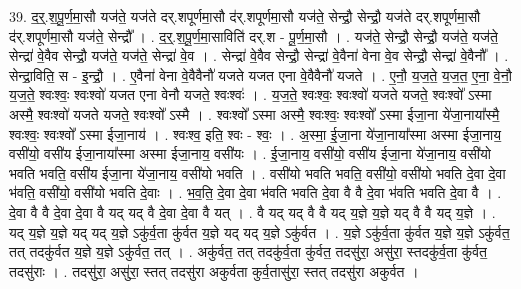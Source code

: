 \documentclass[17pt]{extarticle}
\begin{document}
39. द॒र्॒.श॒पू॒र्ण॒मा॒सौ यज॑ते॒ यज॑ते दर्.शपूर्णमा॒सौ द॑र्.शपूर्णमा॒सौ यज॑ते॒ सेन्द्रौ॒ सेन्द्रौ॒ यज॑ते दर्.शपूर्णमा॒सौ द॑र्.शपूर्णमा॒सौ यज॑ते॒ सेन्द्रौ᳚ । . द॒र्॒.श॒पू॒र्ण॒मा॒साविति॑ दर्.श - पू॒र्ण॒मा॒सौ । . यज॑ते॒ सेन्द्रौ॒ सेन्द्रौ॒ यज॑ते॒ यज॑ते॒ सेन्द्रा॑ वे॒वैव सेन्द्रौ॒ यज॑ते॒ यज॑ते॒ सेन्द्रा॑ वे॒व । . सेन्द्रा॑ वे॒वैव सेन्द्रौ॒ सेन्द्रा॑ वे॒वैना॑ वेना वे॒व सेन्द्रौ॒ सेन्द्रा॑ वे॒वैनौ᳚ । . सेन्द्रा॒विति॒ स - इ॒न्द्रौ॒ । . ए॒वैना॑ वेना वे॒वैवैनौ॑ यजते यजत एना वे॒वैवैनौ॑ यजते । . ए॒नौ॒ य॒ज॒ते॒ य॒ज॒त॒ ए॒ना॒ वे॒नौ॒ य॒ज॒ते॒ श्वःश्वः॒ श्वःश्वो॑ यजत एना वेनौ यजते॒ श्वःश्वः॑ । . य॒ज॒ते॒ श्वःश्वः॒ श्वःश्वो॑ यजते यजते॒ श्वःश्वो᳚ ऽस्मा अस्मै॒ श्वःश्वो॑ यजते यजते॒ श्वःश्वो᳚ ऽस्मै । . श्वःश्वो᳚ ऽस्मा अस्मै॒ श्वःश्वः॒ श्वःश्वो᳚ ऽस्मा ईजा॒ना ये॑जा॒नाया᳚स्मै॒ श्वःश्वः॒ श्वःश्वो᳚ ऽस्मा ईजा॒नाय॑ । . श्वःश्व॒ इति॒ श्वः - श्वः॒ । . अ॒स्मा॒ ई॒जा॒ना ये॑जा॒नाया᳚स्मा अस्मा ईजा॒नाय॒ वसी॑यो॒ वसी॑य ईजा॒नाया᳚स्मा अस्मा ईजा॒नाय॒ वसी॑यः । . ई॒जा॒नाय॒ वसी॑यो॒ वसी॑य ईजा॒ना ये॑जा॒नाय॒ वसी॑यो भवति भवति॒ वसी॑य ईजा॒ना ये॑जा॒नाय॒ वसी॑यो भवति । . वसी॑यो भवति भवति॒ वसी॑यो॒ वसी॑यो भवति दे॒वा दे॒वा भ॑वति॒ वसी॑यो॒ वसी॑यो भवति दे॒वाः । . भ॒व॒ति॒ दे॒वा दे॒वा भ॑वति भवति दे॒वा वै वै दे॒वा भ॑वति भवति दे॒वा वै । . दे॒वा वै वै दे॒वा दे॒वा वै यद् यद् वै दे॒वा दे॒वा वै यत् । . वै यद् यद् वै वै यद् य॒ज्ञे य॒ज्ञे यद् वै वै यद् य॒ज्ञे । . यद् य॒ज्ञे य॒ज्ञे यद् यद् य॒ज्ञे ऽकु॑र्व॒ता कु॑र्वत य॒ज्ञे यद् यद् य॒ज्ञे ऽकु॑र्वत । . य॒ज्ञे ऽकु॑र्व॒ता कु॑र्वत य॒ज्ञे य॒ज्ञे ऽकु॑र्वत॒ तत् तदकु॑र्वत य॒ज्ञे य॒ज्ञे ऽकु॑र्वत॒ तत् । . अकु॑र्वत॒ तत् तदकु॑र्व॒ता कु॑र्वत॒ तदसु॑रा॒ असु॑रा॒ स्तदकु॑र्व॒ता कु॑र्वत॒ तदसु॑राः । . तदसु॑रा॒ असु॑रा॒ स्तत् तदसु॑रा अकुर्वता कुर्व॒तासु॑रा॒ स्तत् तदसु॑रा अकुर्वत । \newline
\end{document}
